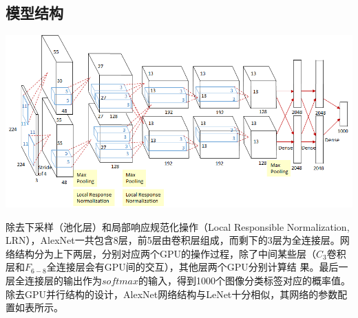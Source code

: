 \documentclass[12pt,a4paper,UTF8,twoside]{book}
\begin{document}
\hypertarget{ux6a21ux578bux7ed3ux6784-1}{%
\subsection{模型结构}\label{ux6a21ux578bux7ed3ux6784-1}}

\begin{center}\includegraphics[width=0.7\linewidth]{img/02-03} \end{center}

除去下采样（池化层）和局部响应规范化操作（Local Responsible Normalization, LRN），AlexNet一共包含8层，前5层由卷积层组成，而剩下的3层为全连接层。网络结构分为上下两层，分别对应两个GPU的操作过程，除了中间某些层（\(C_3\)卷积层和\(F_{6-8}\)全连接层会有GPU间的交互），其他层两个GPU分别计算结 果。最后一层全连接层的输出作为\(softmax\)的输入，得到1000个图像分类标签对应的概率值。除去GPU并行结构的设计，AlexNet网络结构与LeNet十分相似，其网络的参数配置如表所示。
\end{document}
